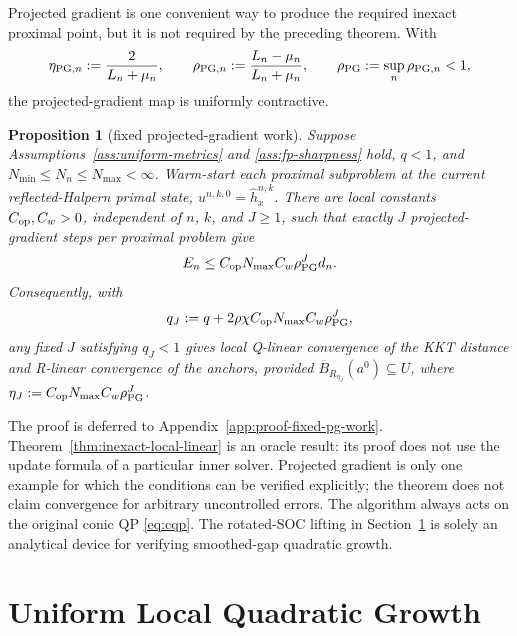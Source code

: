 \documentclass[letterpaper]{article} %
\newtheorem{proposition}[theorem]{Proposition}
\theoremstyle{definition}
\theoremstyle{remark}
\begin{document}
Projected gradient is one convenient way to produce the required inexact
proximal point, but it is not required by the preceding theorem.  With
\[
    \eta_{{\rm PG},n}
    :=
    \frac{2}{L_n+\mu_n},
    \qquad
    \rho_{{\rm PG},n}
    :=
    \frac{L_n-\mu_n}{L_n+\mu_n},
    \qquad
    \rho_{\rm PG}:=\sup_n\rho_{{\rm PG},n}<1,
\]
the projected-gradient map is uniformly contractive.

\begin{proposition}[fixed projected-gradient work]
\label{prop:fixed-pg-work}
Suppose Assumptions~\ref{ass:uniform-metrics} and
\ref{ass:fp-sharpness} hold, $q<1$, and
$N_{\min}\le N_n\le N_{\max}<\infty$.
Warm-start each proximal subproblem at the current reflected-Halpern primal state,
$u^{n,k,0}=\widehat h_x^{n,k}$.  There are local constants
$C_{\rm op},C_w>0$, independent of $n$, $k$, and $J\ge1$, such that exactly
$J$ projected-gradient steps per proximal problem give
\begin{equation}
\label{eq:theory-fixed-j-error}
    E_n
    \le
    C_{\rm op}N_{\max}C_w\rho_{\rm PG}^Jd_n.
\end{equation}
Consequently, with
\begin{equation}
\label{eq:fixed-pg-contraction}
    q_J
    :=
    q+
    2\rho\chi C_{\rm op}N_{\max}C_w\rho_{\rm PG}^J,
\end{equation}
any fixed $J$ satisfying $q_J<1$ gives local Q-linear convergence of the KKT
distance and R-linear convergence of the anchors, provided
$\overline B_{R_{\eta_J}}(a^0)\subseteq U$, where
$\eta_J:=C_{\rm op}N_{\max}C_w\rho_{\rm PG}^J$.
\end{proposition}

The proof is deferred to Appendix~\ref{app:proof-fixed-pg-work}.
Theorem~\ref{thm:inexact-local-linear} is an oracle result: its proof does not
use the update formula of a particular inner solver.  Projected gradient is
only one example for which the conditions can be verified explicitly; the
theorem does not claim convergence for arbitrary uncontrolled errors.  The
algorithm always acts on the original conic QP \eqref{eq:cqp}.  The rotated-SOC
lifting in Section~\ref{sec:conic-geometry} is solely an analytical device for
verifying smoothed-gap quadratic growth.
\fi

\section{Uniform Local Quadratic Growth}
\label{sec:conic-geometry}
\end{document}
